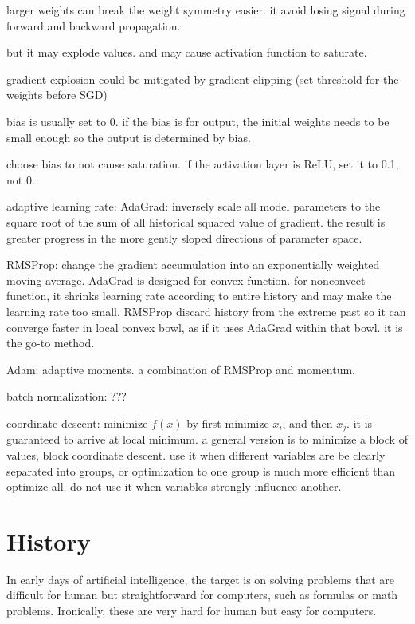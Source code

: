 larger weights can break the weight symmetry easier. it avoid losing signal during forward and backward propagation. 

but it may explode values. and may cause activation function to saturate.

gradient explosion could be mitigated by gradient clipping (set threshold for the weights before SGD)

bias is usually set to 0. if the bias is for output, the initial weights needs to be small enough so the output is determined by bias.

choose bias to not cause saturation. if the activation layer is ReLU, set it to 0.1, not 0.

adaptive learning rate:
AdaGrad: inversely scale all model parameters to the square root of the sum of all historical squared value of gradient. the result is greater progress in the more gently sloped directions of parameter space. 

RMSProp: change the gradient accumulation into an exponentially weighted moving average. AdaGrad is designed for convex function. for nonconvect function, it shrinks learning rate according to entire history and may make the learning rate too small. RMSProp discard history from the extreme past so it can converge faster in local convex bowl, as if it uses AdaGrad within that bowl. it is the go-to method.


Adam: adaptive moments. a combination of RMSProp and momentum. 

batch normalization: ???

coordinate descent: minimize $f(x)$ by first minimize $x_i$, and then $x_j$. it is guaranteed to arrive at local minimum. a general version is to minimize a block of values, block coordinate descent. use it when different variables are be clearly separated into groups, or optimization to one group is much more efficient than optimize all. do not use it when variables strongly influence another.







\section{History}

In early days of artificial intelligence, the target is on solving problems that are difficult for human but straightforward for computers, such as formulas or math problems. Ironically, these are very hard for human but easy for computers.

